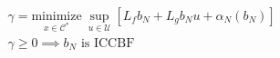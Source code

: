 \documentclass[preview]{standalone}
\begin{document}
\begin{align*}
&\gamma = \underset{x \in \mathcal{C}^*}{\text{minimize}}  \ \sup_{u\in\mathcal{U}} [L_fb_N + L_gb_N u + \alpha_N(b_N)]\\ &\gamma \geq 0 \implies b_N \text{ is ICCBF}
\end{align*}
\end{document}
